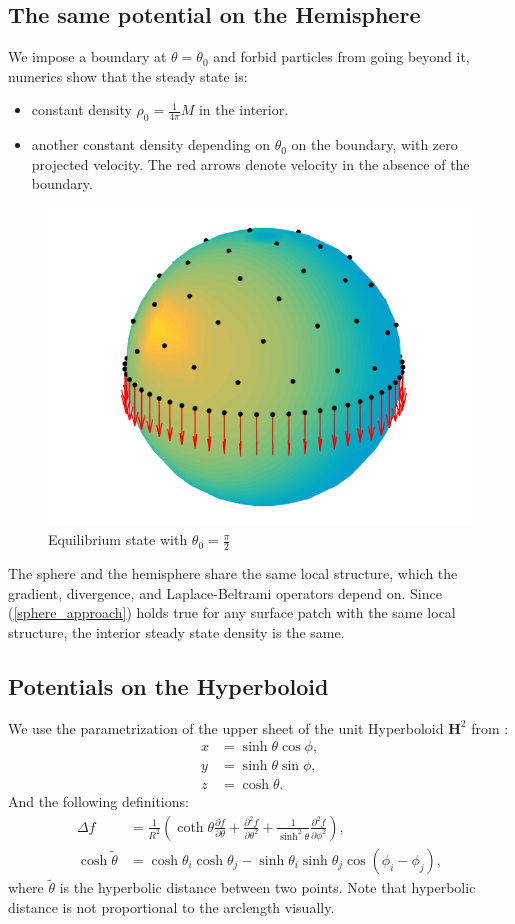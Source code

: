 \documentclass{article}
\newcommand{\p}{\partial}
\newcommand{\h}{\theta}
\begin{document}
\subsection{The same potential on the Hemisphere}
We impose a boundary at $\h=\h_0$ and forbid particles from going beyond it, numerics show that the steady state is:
\begin{itemize}
\item constant density $\rho_0 = \frac{1}{4\pi}M$ in the interior.
\item another constant density depending on $\h_0$ on the boundary, with zero projected velocity. The red arrows denote velocity in the absence of the boundary.
\end{itemize}
\begin{figure}
\centering
\includegraphics[width=0.5\linewidth]{obstacle.png}
\caption{Equilibrium state with $\h_0=\frac{\pi}{2}$}
\end{figure}
The sphere and the hemisphere share the same local structure, which the gradient, divergence, and Laplace-Beltrami operators depend on. Since (\ref{sphere_approach}) holds true for any surface patch with the same local structure, the interior steady state density is the same.

\subsection{Potentials on the Hyperboloid}
We use the parametrization of the upper sheet of the unit Hyperboloid $\mathbf{H}^2$ from \cite{kimura}:
\begin{align*}
x &= \sinh{\h} \cos{\phi}, \\
y &= \sinh{\h} \sin{\phi}, \\
z &= \cosh{\h}.
\end{align*}
And the following definitions:
\begin{align*}
\Delta f &= \frac{1}{R^2} \left( \coth{\h} \frac{\p f}{\p \h} + \frac{\p^2 f}{\p \h^2} + \frac{1}{\sinh^2{\h}} \frac{\p^2 f}{\p \phi^2} \right),\\
\cosh{\tilde{\h}} &=  \cosh{\h_i}\cosh{\h_j} - \sinh{\h_i}\sinh{\h_j}\cos{(\phi_i - \phi_j)},
\end{align*}
where $\tilde{\h}$ is the hyperbolic distance between two points. Note that hyperbolic distance is not proportional to the arclength visually.
\end{document}
